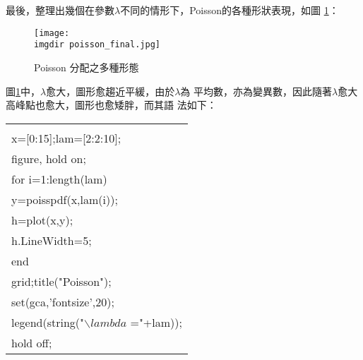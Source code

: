 \begin{enumerate}
{					最後，整理出幾個在參數$\lambda$不同的情形下，Poisson的各種形狀表現，如圖						\ref{poisson_final}：
					\begin{figure}[H]	
		 		 		\centering	 			 	 
   				 		\texttt{[image: \\imgdir 												poisson\_final.jpg]} 
   			 			\caption{Poisson 分配之多種形態}   		
   			 			\label{poisson_final}   			 		 
					\end{figure}
					圖\ref{poisson_final}中，$\lambda$愈大，圖形愈趨近平緩，由於$\lambda$為						平均數，亦為變異數，因此隨著$\lambda$愈大高峰點也愈大，圖形也愈矮胖，而其語						法如下：
					
					\begin{center}\colorbox{slight}{
						\begin{tabular}{p{}}
							\MJHmarker{\textbf{\color{darkblue}{MATLAB語法 :}}}\\		
							x=[0:15];lam=[2:2:10];\\
							figure, hold on;\\
							for i=1:length(lam)\\
 							\quad  y=poisspdf(x,lam(i));\\
  							\quad  h=plot(x,y);\\
  							\quad  h.LineWidth=5;\\
							end\\
							grid;title("Poisson");  \\ 
							set(gca,'fontsize',20); \\
							legend(string("$\backslash lambda$ ="+lam));\\
							hold off;\\
						\end{tabular}
					}
					\end{center}					
				}	
			\end{enumerate}
